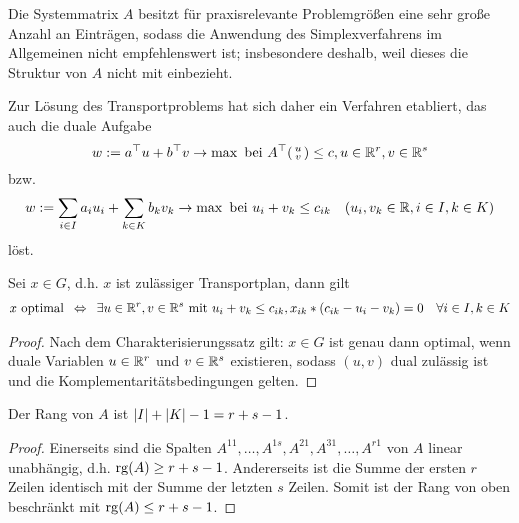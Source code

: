 Die Systemmatrix $A$ besitzt für praxisrelevante Problemgrößen eine sehr große Anzahl an Einträgen, sodass die Anwendung des Simplexverfahrens im Allgemeinen nicht empfehlenswert ist; insbesondere deshalb, weil dieses die Struktur von $A$ nicht mit einbezieht.

Zur Lösung des Transportproblems hat sich daher ein Verfahren etabliert, das auch die duale Aufgabe 
\begin{equation}
	w \mathrel{:=} a^{\top} u + b^{\top} v \to \max \text{ bei } A^{\top} \begin{psmallmatrix} u \\ v \end{psmallmatrix} \le c, u \in \mathbb{R}^r, v \in \mathbb{R}^s
	\label{eq: 3.16}
\end{equation}
bzw.
\begin{equation}
	w \mathrel{:=} \sum_{i \in I} a_i u_i + \sum_{k \in K} b_k v_k \to \max \text{ bei } u_i + v_k \le c_{ik} \quad (u_i, v_k \in \mathbb{R}, i \in I, k \in K)
	\label{eq: 3.17}
\end{equation}
löst.

\begin{satz}[Optimalitätskriterium] %
	\label{satz: 3.14}
	Sei $x \in G$, d.h. $x$ ist zulässiger Transportplan, dann gilt
	\begin{equation*}
		\begin{aligned}
			x \text{ optimal} \enskip \Leftrightarrow \enskip \exists u \in \mathbb{R}^r, v \in \mathbb{R}^s \text{ mit } u_i + v_k \le c_{ik}, x_{ik} * (c_{ik} - u_i - v_k) = 0 \quad \forall i \in I, k \in K
		\end{aligned}
	\end{equation*}
\end{satz}
\begin{proof}
	Nach dem Charakterisierungssatz gilt: $x \in G$ ist genau dann optimal, wenn duale Variablen $u \in \mathbb{R}^r$ und $v \in \mathbb{R}^s$ existieren, sodass $(u,v)$ dual zulässig ist und die Komplementaritätsbedingungen gelten.
\end{proof}

\begin{aussage} %
	Der Rang von $A$ ist $\left| I \right| + \left| K \right| - 1 = r+s-1$.
\end{aussage}
\begin{proof}
	Einerseits sind die Spalten $A^{11}, \dots, A^{1s}, A^{21}, A^{31}, \dots, A^{r1}$ von $A$ linear unabhängig, d.h. $\operatorname{rg}(A) \ge r + s - 1$.
	Andererseits ist die Summe der ersten $r$ Zeilen identisch mit der Summe der letzten $s$ Zeilen. Somit ist der Rang von oben beschränkt mit $\operatorname{rg}(A) \le r + s -1$.
\end{proof}

